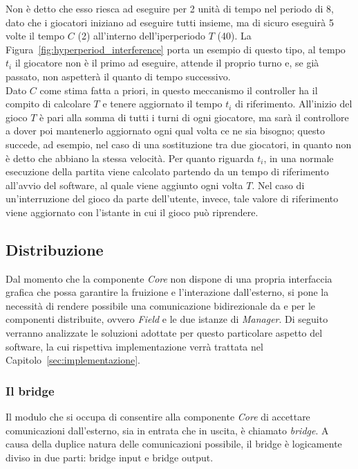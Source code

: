 Non è detto che esso riesca ad eseguire per 2 unità di tempo nel periodo di 8, dato che i giocatori iniziano ad eseguire tutti insieme, ma di sicuro eseguirà 5 volte il tempo $C$ (2) all'interno dell'iperperiodo $T$ (40). La Figura~\ref{fig:hyperperiod_interference} porta un esempio di questo tipo, al tempo $t_i$ il giocatore non è il primo ad eseguire, attende il proprio turno e, se già passato, non aspetterà il quanto di tempo successivo.\\

Dato $C$ come stima fatta a priori, in questo meccanismo il controller ha il compito di calcolare $T$ e tenere aggiornato il tempo $t_i$ di riferimento. All'inizio del gioco $T$ è pari alla somma di tutti i turni di ogni giocatore, ma sarà il controllore a dover poi mantenerlo aggiornato ogni qual volta ce ne sia bisogno; questo succede, ad esempio, nel caso di una sostituzione tra due giocatori, in quanto non è detto che abbiano la stessa velocità. Per quanto riguarda $t_i$, in una normale esecuzione della partita viene calcolato partendo da un tempo di riferimento all'avvio del software, al quale viene aggiunto ogni volta $T$. Nel caso di un'interruzione del gioco da parte dell'utente, invece, tale valore di riferimento viene aggiornato con l'istante in cui il gioco può riprendere.\\

\subsection{Distribuzione}
\label{sec:analisi_distribuzione}

Dal momento che la componente \textit{Core} non dispone di una propria interfaccia grafica che possa garantire la fruizione e l'interazione dall'esterno, si pone la necessità di rendere possibile una comunicazione bidirezionale da e per le componenti distribuite, ovvero \textit{Field} e le due istanze di \textit{Manager}. Di seguito verranno analizzate le soluzioni adottate per questo particolare aspetto del software, la cui rispettiva implementazione verrà trattata nel Capitolo~\ref{sec:implementazione}.

\subsubsection{Il bridge}
\label{sec:analisi_distribuzione_bridge}

Il modulo che si occupa di consentire alla componente \textit{Core} di accettare comunicazioni dall'esterno, sia in entrata che in uscita, è chiamato \textit{bridge}. A causa della duplice natura delle comunicazioni possibile, il bridge è logicamente diviso in due parti: bridge input e bridge output.


